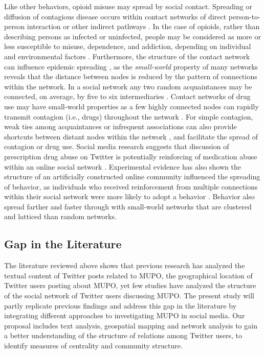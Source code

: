 \documentclass[sigconf]{acmart}
\begin{document}
Like other behaviors, opioid misuse may spread by social contact. Spreading 
or diffusion of contagious disease occurs within contact networks of direct 
person-to-person interaction or other indirect pathways \cite{pastor01}. In 
the case of opioids, rather than describing persons as infected or uninfected, 
people may be considered as more or less susceptible to misuse, dependence, and 
addiction, depending on individual and environmental factors \cite{volkow14}. 
Furthermore, the structure of the contact network can influence epidemic 
spreading \cite{watts98}, as the \emph{small-world} property of many networks 
reveals that the distance between nodes is reduced by the pattern of 
connections within the network. In a social network any two random acquaintances 
may be connected, on average, by five to six intermediaries \cite{travers69}. 
Contact networks of drug use may have small-world properties as a few highly 
connected nodes can rapidly transmit contagion (i.e., drugs) throughout the 
network \cite{shaham03}. For simple contagion, weak ties among acquaintances or 
infrequent associations can also provide shortcuts between distant nodes within 
the network \cite{granovetter73}, and facilitate the spread of contagion or 
drug use. Social media research suggests that discussion of prescription drug 
abuse on Twitter is potentially reinforcing of medication abuse within an 
online social network \cite{hanson13}. Experimental evidence has also shown 
the structure of an artificially constructed online community influenced the 
spreading of behavior, as individuals who received reinforcement from multiple 
connections within their social network were more likely to adopt a behavior 
\cite{centola10}. Behavior also spread farther and faster through with 
small-world networks that are clustered and latticed than random networks.


\subsection{Gap in the Literature} 

The literature reviewed above shows that previous research has analyzed the 
textual content of Twitter posts related to MUPO, the geographical location of 
Twitter users posting about MUPO, yet few studies have analyzed the structure 
of the social network of Twitter users discussing MUPO. The present study will 
partly replicate previous findings and address this gap in the literature by 
integrating different approaches to investigating MUPO in social media. Our 
proposal includes text analysis, geospatial mapping and network analysis to 
gain a better understanding of the structure of relations among Twitter users, 
to identify measures of centrality and community structure. 
\end{document}
